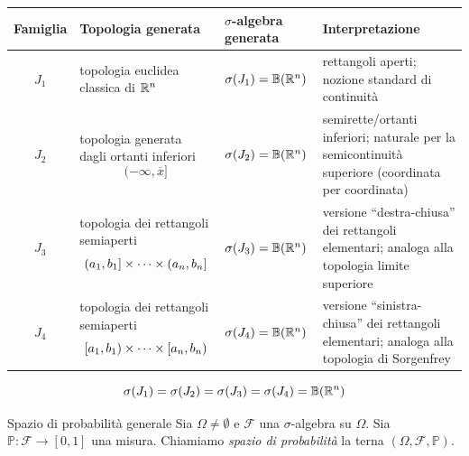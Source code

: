 \documentclass[a4paper]{article}
\begin{document}
\begin{center}
    \begin{table}[h!]
        \centering
        \renewcommand{\arraystretch}{1.35}
        \begin{tabular}{|c|p{4.7cm}|p{3.6cm}|p{5.2cm}|}
            \hline
            \textbf{Famiglia} & \centering \textbf{Topologia generata} & \centering \textbf{\(\sigma\)-algebra generata} & \centering \textbf{Interpretazione} \tabularnewline
            \hline

            \(J_1\)
            &
            topologia euclidea classica di \(\mathbb{R}^n\)
            &
            \(\sigma(J_1)=\mathbb B(\mathbb{R}^n)\)
            &
            rettangoli aperti; nozione standard di continuità
            \tabularnewline
            \hline

            \(J_2\)
            &
            topologia generata dagli ortanti inferiori
            \[
                (-\infty,\overline x]
            \]
            &
            \(\sigma(J_2)=\mathbb B(\mathbb{R}^n)\)
            &
            semirette/ortanti inferiori; naturale per la semicontinuità superiore (coordinata per coordinata)
            \tabularnewline
            \hline

            \(J_3\)
            &
            topologia dei rettangoli semiaperti
            \[
                (a_1,b_1]\times\cdots\times(a_n,b_n]
            \]
            &
            \(\sigma(J_3)=\mathbb B(\mathbb{R}^n)\)
            &
            versione ``destra-chiusa'' dei rettangoli elementari; analoga alla topologia limite superiore
            \tabularnewline
            \hline

            \(J_4\)
            &
            topologia dei rettangoli semiaperti
            \[
                [a_1,b_1)\times\cdots\times[a_n,b_n)
            \]
            &
            \(\sigma(J_4)=\mathbb B(\mathbb{R}^n)\)
            &
            versione ``sinistra-chiusa'' dei rettangoli elementari; analoga alla topologia di Sorgenfrey
            \tabularnewline
            \hline
        \end{tabular}
        \vspace{0.3cm}
        \[
            \sigma(J_1)=\sigma(J_2)=\sigma(J_3)=\sigma(J_4)=\mathbb B(\mathbb{R}^n)
        \]
    \end{table}
\end{center}

\begin{snippetdefinition}{Spazio di probabilità generale}
    Sia \(\Omega \neq \emptyset\)
    e \(\mathcal F\) una \(\sigma\)-algebra su \(\Omega\).
    Sia \(\mathbb P \colon \mathcal F \to [0,1]\)
    una misura.
    Chiamiamo \emph{spazio di probabilità}
    la terna \((\Omega, \mathcal F, \mathbb P)\).
\end{snippetdefinition}
\end{document}
